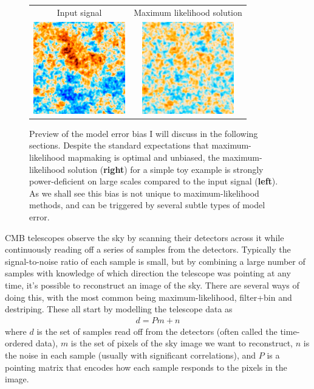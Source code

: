 \documentclass[twocolumn,apj]{aastex63}
\newcommand{\dfn}[1]{\textbf{#1}}
\newenvironment{closetabcols}[1][0.5mm]{\setlength{\tabcolsep}{#1}}{}
\begin{document}
\begin{figure}
	\centering
	\begin{closetabcols}
	\begin{tabular}{cc}
		Input signal & Maximum likelihood solution \\
		\includegraphics[width=40mm]{subpix/toy2d_input_signal_map.png} &
		\includegraphics[width=40mm]{subpix/toy2d_ml_nn_signal_map.png} \\
	\end{tabular}
	\end{closetabcols}
	\caption{Preview of the model error bias I will discuss in the following
	sections. Despite the standard expectations that maximum-likelihood mapmaking
	is optimal and unbiased, the maximum-likelihood solution (\dfn{right})
	for a simple toy example is strongly power-deficient on large scales
	compared to the input signal (\dfn{left}). As we shall see this bias
	is not unique to maximum-likelihood methods, and can be triggered by
	several subtle types of model error.}
	\label{fig:maps-2d}
\end{figure}

CMB telescopes observe the sky by scanning their detectors across
it while continuously reading off a series of samples from the
detectors. Typically the signal-to-noise ratio of each sample is
small, but by combining a large number of samples with knowledge
of which direction the telescope was pointing at any time, it's
possible to reconstruct an image of the sky. There are several
ways of doing this, with the most common being maximum-likelihood,
filter+bin and destriping. These all start by modelling the
telescope data as
\begin{align}
	d = Pm + n \label{eq:model}
\end{align}
where $d$ is the set of samples read off from the detectors
(often called the time-ordered data), $m$ is the set of pixels
of the sky image we want to reconstruct, $n$ is the noise
in each sample (usually with significant correlations), and
$P$ is a pointing matrix that encodes how each sample responds
to the pixels in the image.
\end{document}
